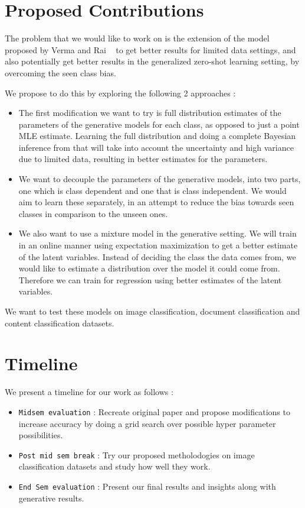 \documentclass[9pt]{article}
\begin{document}
\section*{Proposed Contributions}
The problem that we would like to work on is the extension of the model proposed by Verma and Rai ~\cite{KumarVerma2017} to get better results for limited data settings, and also potentially get better results in the generalized zero-shot learning setting,  by overcoming the seen class bias. 
\par
We propose to do this by exploring the following 2 approaches :
\begin{itemize}
\item {The first modification we want to try is full distribution estimates of the parameters of the generative models for each class, as opposed to just a point MLE estimate. Learning the full distribution and doing a complete Bayesian inference from that will take into account the uncertainty and high variance due to limited data, resulting in better estimates for the parameters.}
\item {
    We want to decouple the parameters of the generative models, into two parts, one which is class dependent and one that is class independent. We would aim to learn these separately, in an attempt to reduce the bias towards seen classes in comparison to the unseen ones. 
}
\item {We also want to use a mixture model in the generative setting. We will train in an online manner using expectation maximization to get a better estimate of the latent variables. Instead of deciding the class the data comes from, we would like to estimate a distribution over the model it could come from. Therefore we can train for regression using better estimates of the latent variables. }
\end{itemize}
We want to test these models on image classification, document classification and content classification datasets. 
\section*{Timeline}
We present a timeline for our work as follows :
\begin{itemize}
    \item {\texttt{Midsem evaluation} : Recreate original paper \cite{KumarVerma2017} and propose modifications to increase accuracy by doing a grid search over possible hyper parameter possibilities. }
    \item {\texttt{Post mid sem break} : Try our proposed metholodogies on image classification datasets and study how well they work.}
    \item {\texttt{End Sem evaluation} : Present our final results and insights along with generative results.}
\end{itemize}
\printbibliography
\end{document}
